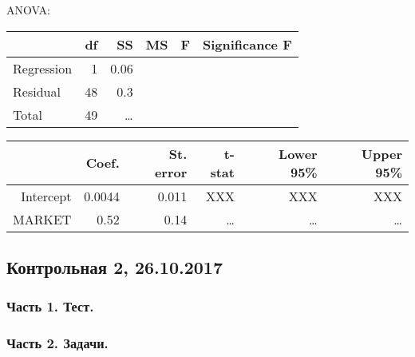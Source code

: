 \begin{enumerate}
ANOVA:

\begin{tabular}{lrrrrr} \toprule
      	   	 &  df 	& SS		& MS 	& F & Significance F \\
\midrule
Regression   & 1 	& 0.06  	& 	 	&  	& 		\\
Residual     & 48  	& 0.3   	&     	&  	&     	\\
Total        & 49  	& \ldots  	&    	&  	&     	\\
\bottomrule
\end{tabular}


\begin{tabular}{rrrrrr}
  \hline
 			& Coef. 	& St. error	& t-stat 	& Lower 95\% 	& Upper 95\% \\
  \hline
Intercept 	& 0.0044 	& 0.011 	& XXX 		& XXX 			& XXX \\
MARKET		& 0.52 		& 0.14 		& \ldots 	& \ldots 		& \ldots \\
   \hline
\end{tabular}


\end{enumerate}




\subsection{Контрольная 2, 26.10.2017}



\subsubsection*{Часть 1. Тест.}







\subsubsection*{Часть 2. Задачи.}




